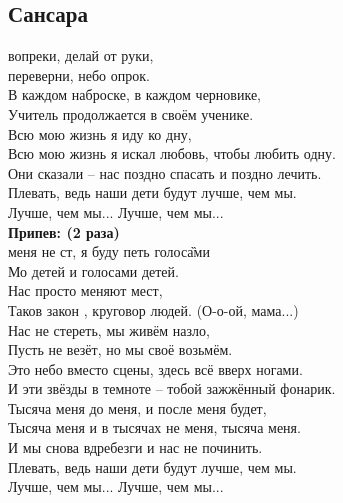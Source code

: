 \documentclass[fleqn,a5paper,12pt,twoside]{guitartabs}
\begin{document}
\subsection*{Сансара}
     вопреки, делай от руки, \\
     переверни, небо опрок. \\
    В каждом наброске, в каждом черновике, \\
    Учитель продолжается в своём ученике. \\
    Всю мою жизнь я иду ко дну,           \\ 
    Всю мою жизнь я искал любовь, чтобы любить одну. \\         
    Они сказали -- нас поздно спасать и поздно лечить.     \\    
    Плевать, ведь наши дети будут лучше, чем мы.\\
    Лучше, чем мы... Лучше, чем мы... \\

    \-\hspace{10mm}\textbf{Припев: (2 раза)}\\
    \-\hspace{10mm} меня не ст, я буду петь голос\G{ами}\\
    \-\hspace{10mm}Мо детей и голосами  детей.\\
    \-\hspace{10mm}Нас просто меняют мест,\\
    \-\hspace{10mm}Таков закон , круговор людей. (О-о-ой, мама...) \\
    
    Нас не стереть, мы живём назло,\\
    Пусть не везёт, но мы своё возьмём. \\
    Это небо вместо сцены, здесь всё вверх ногами.\\
    И эти звёзды в темноте -- тобой зажжённый фонарик. \\
    Тысяча меня до меня, и после меня будет,\\
    Тысяча меня и в тысячах не меня, тысяча меня.\\ 
    И мы снова вдребезги и нас не починить. \\
    Плевать, ведь наши дети будут лучше, чем мы. \\
    Лучше, чем мы... Лучше, чем мы...\\
\end{document}
